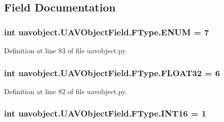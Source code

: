 \subsection{Field Documentation}
\hypertarget{classuavobject_1_1_u_a_v_object_field_1_1_f_type_a0a214155a61f3a4012a5a438f981e8da}{
\subsubsection[{E\-N\-U\-M}]{\setlength{\rightskip}{0pt plus 5cm}int uavobject.\-U\-A\-V\-Object\-Field.\-F\-Type.\-E\-N\-U\-M = 7\hspace{0.3cm}{\ttfamily [static]}}}\label{classuavobject_1_1_u_a_v_object_field_1_1_f_type_a0a214155a61f3a4012a5a438f981e8da}


Definition at line 83 of file uavobject.\-py.

\hypertarget{classuavobject_1_1_u_a_v_object_field_1_1_f_type_abbdf1e0897ffb96a8f9f131c9dd66949}{
\subsubsection[{F\-L\-O\-A\-T32}]{\setlength{\rightskip}{0pt plus 5cm}int uavobject.\-U\-A\-V\-Object\-Field.\-F\-Type.\-F\-L\-O\-A\-T32 = 6\hspace{0.3cm}{\ttfamily [static]}}}\label{classuavobject_1_1_u_a_v_object_field_1_1_f_type_abbdf1e0897ffb96a8f9f131c9dd66949}


Definition at line 82 of file uavobject.\-py.

\hypertarget{classuavobject_1_1_u_a_v_object_field_1_1_f_type_ad160d7505855cb0bc2119ad550a5ce74}{
\subsubsection[{I\-N\-T16}]{\setlength{\rightskip}{0pt plus 5cm}int uavobject.\-U\-A\-V\-Object\-Field.\-F\-Type.\-I\-N\-T16 = 1\hspace{0.3cm}{\ttfamily [static]}}}\label{classuavobject_1_1_u_a_v_object_field_1_1_f_type_ad160d7505855cb0bc2119ad550a5ce74}


